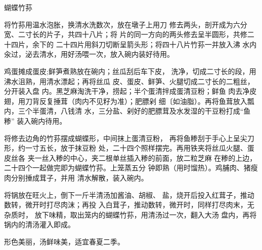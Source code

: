 \begin{recipe}{蝴蝶竹荪}

\ingredients



\cooking

\step 	将竹荪用温水泡胀，换清水洗数次，放在墩子上用刀 修去两头，剖开成为六分宽、二寸长的片子，共四十八片；将 片的同一方向的两头修去呈半圆形，共修二十四片，余下的 二十四片用斜刀切断呈箭头形；将四十八片竹荪一并放入沸 水内汆过，泌去清水，用好汤喂一次，放入碗内装好待用。

\step 	鸡蛋摊成蛋皮;鲜笋煮熟放在碗内；丝瓜刮后车下皮， 洗净，切成二寸长的段，用沸水沮熟，用清水漂起；再将丝瓜 皮、蛋皮、鲜笋、火腿切成二寸长的二粗丝，分开装入盘 内。黑芝麻淘洗干净，捞起；半个蛋清拌成蛋清豆粉；鲜鱼 肉去净皮翅，用刀背反复捶茸（肉内不见籽为准）；肥膘剁 细〔如油脂）。再将鱼茸放入瓢内，三个半蛋清，八钱清 水，三分盐、剁好的肥膘茸及水发湿的干豆粉打成“鱼糁” 装入碗内待用。

\step 	将修去边角的竹荪摆成蝴蝶形，中间抹上蛋清豆粉， 再将鱼糁刮于手心上呈尖刀形，约一寸五长，放于抹豆粉 处，二十四个照样摆完。再用铁夹将丝瓜火腿、蛋皮丝各 夹一丝入糁的中心，夹二根单丝插入糁的前面，放二粒芝麻 在糁的上边，二十四个一起做完即为蝴蝶竹荪。上笼蒸五分 钟即熟（用时馏热）。鸡脯肉、猪瘦肉分别捶成茸子，并用 清水解散，装入碗内。

\step 将锅放在旺火上，倒下一斤半清汤加酱油、胡椒、 盐，烧开后投入红茸子，推动数转，微开时打尽肉沫；再投 入白茸子，推动数转，微开时，同样打尽肉末，无杂质时， 放下味精，取出笼内的蝴蝶竹荪，用清汤过一次，翻入大汤 盘内，再将锅内的清汤灌入即成。

\notes

形色美丽，汤鲜味美，适宜春夏二季。

\end{recipe}

